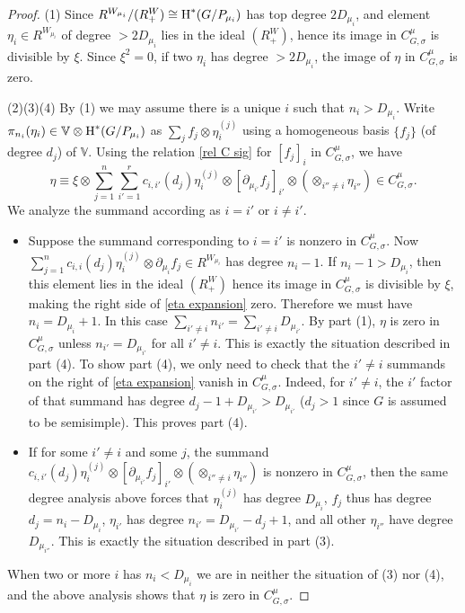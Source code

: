 \documentclass[reqno]{amsart}
\numberwithin{equation}{subsection}
\theoremstyle{definition}
\def\VV{\mathbb{V}}
\newcommand\ot{\otimes}
\newcommand{\cohog}[2]{\textup{H}^{#1}({#2})}     %
\newcommand{\s}{\sigma}
\newcommand{\y}{\eta}
\newcommand\pl{\partial}
\begin{document}
\begin{proof}
    (1) Since $R^{W_{\mu_i}}/(R^W_+)\cong \cohog{*}{G/P_{\mu_i}}$ has top degree $2D_{\mu_i}$, and element $\y_i\in R^{W_{\mu_i}}$ of degree $>2D_{\mu_i}$ lies in the ideal $(R^W_+)$, hence its image in $C^\mu_{G,\s}$ is divisible by $\xi$. Since $\xi^2=0$, if two $\y_i$ has degree $>2D_{\mu_i}$, the image of $\y$ in $C^\mu_{G,\s}$ is zero.

    (2)(3)(4) By (1) we may assume there is a unique $i$ such that $n_i>D_{\mu_i}$. Write $\pi_{n_i}(\y_i)\in \VV\ot \cohog{*}{G/P_{\mu_i}}$ as $\sum_j f_j\ot \y^{(j)}_i$ using a homogeneous basis $\{f_j\}$ (of degree $d_j$) of $\VV$. Using the relation \eqref{rel C sig} for $[f_j]_i$ in $C^\mu_{G,\s}$, we have
    \begin{equation}\label{eta expansion}
        \y\equiv \xi\ot \sum_{j=1}^n\sum_{i'=1}^rc_{i,i'}(d_j)\y_i^{(j)}\ot [\pl_{\mu_{i'}}f_j]_{i'}\ot(\ot_{i''\ne i}\y_{i''})\in C^\mu_{G,\s}.
    \end{equation}
    We analyze the summand according as $i=i'$ or $i\ne i'$.
    \begin{itemize}
        \item Suppose the summand corresponding to $i=i'$ is nonzero in $C^\mu_{G,\s}$. Now $\sum_{j=1}^n c_{i,i}(d_j)\y_i^{(j)}\ot \pl_{\mu_{i}}f_j\in R^{W_{\mu_i}}$ has degree $n_i-1$. If $n_i-1>D_{\mu_i}$, then this element lies in the ideal $(R^W_+)$ hence its image in $C^\mu_{G,\s}$ is divisible by $\xi$, making the right side of \eqref{eta expansion} zero. Therefore we must have $n_i=D_{\mu_i}+1$. In this case $\sum_{i'\ne i}n_{i'}=\sum_{i'\ne i}D_{\mu_{i'}}$. By part (1), $\y$ is zero in $C^\mu_{G,\s}$ unless $n_{i'}=D_{\mu_{i'}}$ for all $i'\ne i$. This is exactly the situation described in part (4). To show part (4), we only need to check that the $i'\ne i$ summands on the right of \eqref{eta expansion} vanish in $C^\mu_{G,\s}$. Indeed, for $i'\ne i$, the $i'$ factor of that summand has degree $d_j-1+D_{\mu_{i'}}>D_{\mu_{i'}}$ ($d_j>1$ since $G$ is assumed to be semisimple). This proves part (4).

        \item If for some $i'\ne i$ and some $j$, the summand $c_{i,i'}(d_j)\y_i^{(j)}\ot [\pl_{\mu_{i'}}f_j]_{i'}\ot(\ot_{i''\ne i}\y_{i''})$ is nonzero in $C^\mu_{G,\s}$, then the same degree analysis above forces that $\y_i^{(j)}$ has degree $D_{\mu_i}$, $f_j$ thus has degree $d_j=n_i-D_{\mu_i}$, $\y_{i'}$ has degree $n_{i'}=D_{\mu_{i'}}-d_j+1$, and all other $\y_{i''}$ have degree $D_{\mu_{i''}}$. This is exactly the situation described in  part (3).
    \end{itemize}
    When two or more $i$ has $n_i<D_{\mu_i}$ we are in neither the situation of (3) nor (4), and the above analysis shows that $\y$ is zero in $C^\mu_{G,\s}$.
\end{proof}
\end{document}
